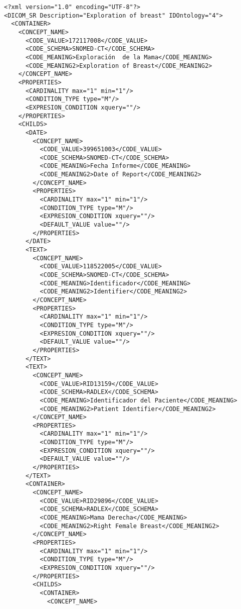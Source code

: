 \lstset{escapechar=@,style=dicom}

\begin{lstlisting}[label=some-code,caption=Some Code]
<?xml version="1.0" encoding="UTF-8"?>
<DICOM_SR Description="Exploration of breast" IDOntology="4">
  <CONTAINER>
    <CONCEPT_NAME>
      <CODE_VALUE>172117008</CODE_VALUE>
      <CODE_SCHEMA>SNOMED-CT</CODE_SCHEMA>
      <CODE_MEANING>Exploración  de la Mama</CODE_MEANING>
      <CODE_MEANING2>Exploration of Breast</CODE_MEANING2>
    </CONCEPT_NAME>
    <PROPERTIES>
      <CARDINALITY max="1" min="1"/>
      <CONDITION_TYPE type="M"/>
      <EXPRESION_CONDITION xquery=""/>
    </PROPERTIES>
    <CHILDS>
      <DATE>
        <CONCEPT_NAME>
          <CODE_VALUE>399651003</CODE_VALUE>
          <CODE_SCHEMA>SNOMED-CT</CODE_SCHEMA>
          <CODE_MEANING>Fecha Informe</CODE_MEANING>
          <CODE_MEANING2>Date of Report</CODE_MEANING2>
        </CONCEPT_NAME>
        <PROPERTIES>
          <CARDINALITY max="1" min="1"/>
          <CONDITION_TYPE type="M"/>
          <EXPRESION_CONDITION xquery=""/>
          <DEFAULT_VALUE value=""/>
        </PROPERTIES>
      </DATE>
      <TEXT>
        <CONCEPT_NAME>
          <CODE_VALUE>118522005</CODE_VALUE>
          <CODE_SCHEMA>SNOMED-CT</CODE_SCHEMA>
          <CODE_MEANING>Identificador</CODE_MEANING>
          <CODE_MEANING2>Identifier</CODE_MEANING2>
        </CONCEPT_NAME>
        <PROPERTIES>
          <CARDINALITY max="1" min="1"/>
          <CONDITION_TYPE type="M"/>
          <EXPRESION_CONDITION xquery=""/>
          <DEFAULT_VALUE value=""/>
        </PROPERTIES>
      </TEXT>
      <TEXT>
        <CONCEPT_NAME>
          <CODE_VALUE>RID13159</CODE_VALUE>
          <CODE_SCHEMA>RADLEX</CODE_SCHEMA>
          <CODE_MEANING>Identificador del Paciente</CODE_MEANING>
          <CODE_MEANING2>Patient Identifier</CODE_MEANING2>
        </CONCEPT_NAME>
        <PROPERTIES>
          <CARDINALITY max="1" min="1"/>
          <CONDITION_TYPE type="M"/>
          <EXPRESION_CONDITION xquery=""/>
          <DEFAULT_VALUE value=""/>
        </PROPERTIES>
      </TEXT>
      <CONTAINER>
        <CONCEPT_NAME>
          <CODE_VALUE>RID29896</CODE_VALUE>
          <CODE_SCHEMA>RADLEX</CODE_SCHEMA>
          <CODE_MEANING>Mama Derecha</CODE_MEANING>
          <CODE_MEANING2>Right Female Breast</CODE_MEANING2>
        </CONCEPT_NAME>
        <PROPERTIES>
          <CARDINALITY max="1" min="1"/>
          <CONDITION_TYPE type="M"/>
          <EXPRESION_CONDITION xquery=""/>
        </PROPERTIES>
        <CHILDS>
          <CONTAINER>
            <CONCEPT_NAME>

\end{lstlisting}
